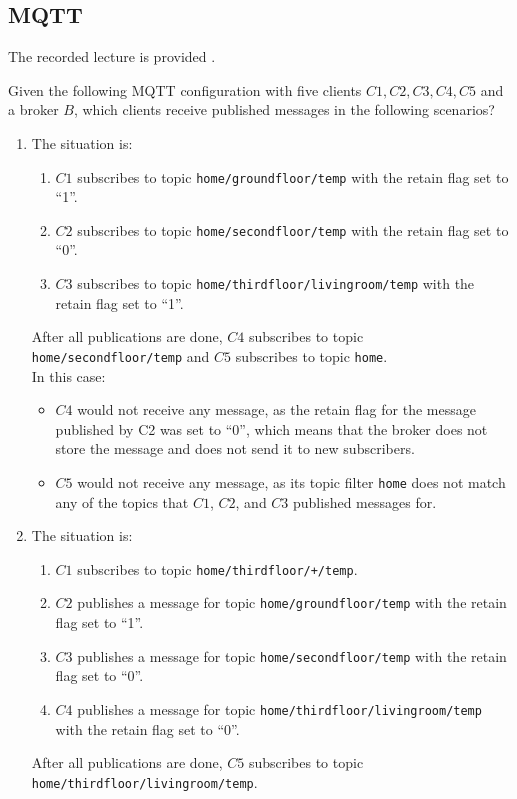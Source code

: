 \newpage\subsection{MQTT}

The recorded lecture is provided .

\begin{ejercicio}
    Given the following MQTT configuration with five clients $C1, C2, C3, C4, C5$ and a broker $B$, which clients receive published messages in the following scenarios?
    \begin{enumerate}[label=(\alph*)]
        \item The situation is:
        \begin{enumerate}[label=\arabic*)]
            \item $C1$ subscribes to topic \texttt{home/groundfloor/temp} with the retain flag set to ``1''.
            \item $C2$ subscribes to topic \texttt{home/secondfloor/temp} with the retain flag set to ``0''.
            \item $C3$ subscribes to topic \texttt{home/thirdfloor/livingroom/temp} with the retain flag set to ``1''.
        \end{enumerate}
        After all publications are done, $C4$ subscribes to topic \texttt{home/secondfloor/temp} and $C5$ subscribes to topic \texttt{home}.\\

        In this case:
        \begin{itemize}
            \item $C4$ would not receive any message, as the retain flag for the message published by C2 was set to ``0'', which means that the broker does not store the message and does not send it to new subscribers.
            \item $C5$ would not receive any message, as its topic filter \texttt{home} does not match any of the topics that $C1$, $C2$, and $C3$ published messages for.
        \end{itemize}
        \item The situation is:
        \begin{enumerate}[label=\arabic*)]
            \item $C1$ subscribes to topic \texttt{home/thirdfloor/+/temp}.
            \item $C2$ publishes a message for topic \texttt{home/groundfloor/temp} with the retain flag set to ``1''.
            \item $C3$ publishes a message for topic \texttt{home/secondfloor/temp} with the retain flag set to ``0''.
            \item $C4$ publishes a message for topic \texttt{home/thirdfloor/livingroom/temp} with the retain flag set to ``0''.
        \end{enumerate}
        After all publications are done, $C5$ subscribes to topic \texttt{home/thirdfloor/livingroom/temp}.\\


\end{enumerate}
\end{ejercicio}
